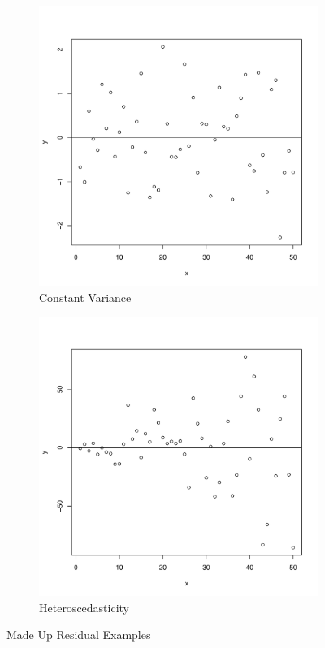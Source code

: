 \documentclass[11pt,openany]{book}\usepackage[]{graphicx}\usepackage[]{color}
\begin{document}
{\begin{figure}
        \centering
        \begin{subfigure}[b]{0.45\textwidth}
                \centering
                \includegraphics[width=\textwidth]{15_Diagnostics/convar.pdf}%
                \caption{Constant Variance \label{fig:convar15}}
        \end{subfigure}
        \begin{subfigure}[b]{0.45\textwidth}
                \centering
                \includegraphics[width=\textwidth]{15_Diagnostics/heterovar.pdf}%
                \caption{Heteroscedasticity \label{fig:hetero15}}
        \end{subfigure}
        \caption{Made Up Residual Examples}
\end{figure}  

}
\end{document}
